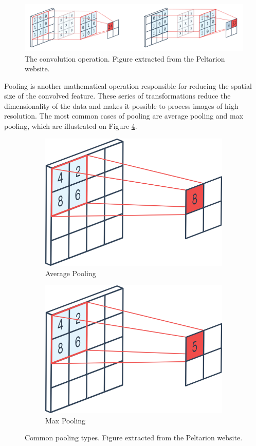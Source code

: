 \begin{figure}[h!tp]
    \centering
    \includegraphics[width=.89\textwidth]{imgs/chap3_convolution.png}
    \caption[The convolution operation.]{The convolution operation. Figure extracted from the Peltarion website\footnotemark.}
    \label{fig:convolution}
\end{figure}


Pooling is another mathematical operation responsible for reducing the spatial size of the convolved feature. These series of transformations reduce the dimensionality of the data and makes it possible to process images of high resolution. The most common cases of pooling are average pooling and max pooling, which are illustrated on Figure \ref{fig:pooling}.

\begin{figure}[h!tp]
\centering
\begin{subfigure}{.45\textwidth}
  \centering
  \includegraphics[width=.5\linewidth]{imgs/chap3_max_pooling.png}
  \caption{Average Pooling}
  \label{fig:sub1}
\end{subfigure}
\begin{subfigure}{.45\textwidth}
  \centering
  \includegraphics[width=.5\linewidth]{imgs/chap3_avg_pooling.png}
  \caption{Max Pooling}
  \label{fig:sub2}
\end{subfigure}
\caption[Common pooling types.]{Common pooling types. Figure extracted from the Peltarion website\footnotemark.}
\label{fig:pooling}
\end{figure}

